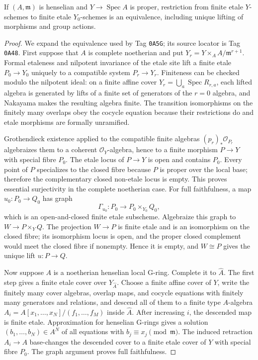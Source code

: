 \begin{lemma}
\label{lemma:weil-pbc-finite-etale-henselian-lifting}
If $(A,\mathfrak m)$ is henselian and $Y\to\operatorname{Spec}A$ is proper,
restriction from finite etale $Y$-schemes to finite etale $Y_0$-schemes is an
equivalence, including unique lifting of morphisms and group actions.
\end{lemma}
\begin{proof}

We expand the equivalence used by Tag \texttt{0A5G}; its source locator is
Tag \texttt{0A48}.  First suppose that $A$ is complete noetherian and put
$Y_r=Y\times_AA/\mathfrak m^{r+1}$.  Formal etaleness and nilpotent
invariance of the etale site lift a finite etale $P_0\to Y_0$ uniquely to a
compatible system $P_r\to Y_r$.  Finiteness can be checked modulo the
nilpotent ideal: on a finite affine cover
$Y_r=\bigcup_a\operatorname{Spec}R_{r,a}$, each lifted algebra is generated
by lifts of a finite set of generators of the $r=0$ algebra, and Nakayama
makes the resulting algebra finite.  The transition isomorphisms on the
finitely many overlaps obey the cocycle equation because their restrictions
do and etale morphisms are formally unramified.

Grothendieck existence applied to the compatible finite algebras
$(p_r)_*\mathcal O_{P_r}$ algebraizes them to a coherent
$\mathcal O_Y$-algebra, hence to a finite morphism $P\to Y$ with special
fibre $P_0$.  The etale locus of $P\to Y$ is open and contains $P_0$.
Every point of $P$ specializes to the closed fibre because $P$ is proper
over the local base; therefore the complementary closed non-etale locus is
empty.  This proves essential surjectivity in the complete noetherian case.
For full faithfulness, a map $u_0:P_0\to Q_0$ has graph
\[
 \Gamma_{u_0}:P_0\longrightarrow P_0\times_{Y_0}Q_0,
\]
which is an open-and-closed finite etale subscheme.  Algebraize this graph to
$W\to P\times_YQ$.  The projection $W\to P$ is finite etale and is an
isomorphism on the closed fibre; its isomorphism locus is open, and the
proper closed complement would meet the closed fibre if nonempty.  Hence it
is empty, and $W\cong P$ gives the unique lift $u:P\to Q$.

Now suppose $A$ is a noetherian henselian local G-ring.  Complete it to
$\widehat A$.  The first step gives a finite etale cover over
$Y_{\widehat A}$.  Choose a finite affine cover of $Y$, write the finitely
many cover algebras, overlap maps, and cocycle equations with finitely many
generators and relations, and descend all of them to a finite type
$A$-algebra
$A_i=A[x_1,\ldots,x_N]/(f_1,\ldots,f_M)$ inside $\widehat A$.
After increasing $i$, the descended map is finite etale.  Approximation for
henselian G-rings gives a solution $(b_1,\ldots,b_N)\in A^N$ of all equations
with $b_j\equiv x_j\pmod{\mathfrak m}$.  The induced retraction
$A_i\to A$ base-changes the descended cover to a finite etale cover of $Y$
with special fibre $P_0$.  The graph argument proves full faithfulness.


\end{proof}
